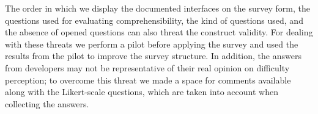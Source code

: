The order in which we display the documented
interfaces on the survey form, the questions used for evaluating
comprehensibility, the kind of questions used, and the absence of opened questions
can also threat the construct validity. For dealing with these threats we
perform a pilot before applying the survey and used the results from the pilot
to improve the survey structure. In addition, the answers from developers may not be
representative of their real opinion on difficulty perception; to overcome this
threat we made a space for comments available along with the Likert-scale
questions, which are taken into account when collecting the answers.
